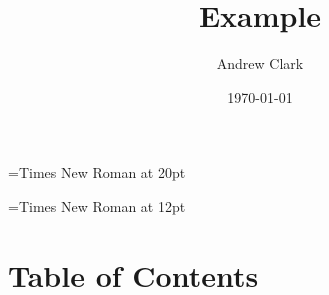 \documentclass{article}
\begin{document}
	\font\titlefont={Times New Roman} at 20pt
	\title{{\titlefont Example}}

	\font\bottomtextfont={Times New Roman} at 12pt
	\date{{\bottomtextfont} \today}
	\author{{\bottomtextfont Andrew Clark}}

	\setmainfont{Times New Roman}
	\setmonofont{Courier New}

	\maketitle

	\newpage



\section{Table of Contents}
	\tableofcontents
	\newpage
\end{document}
